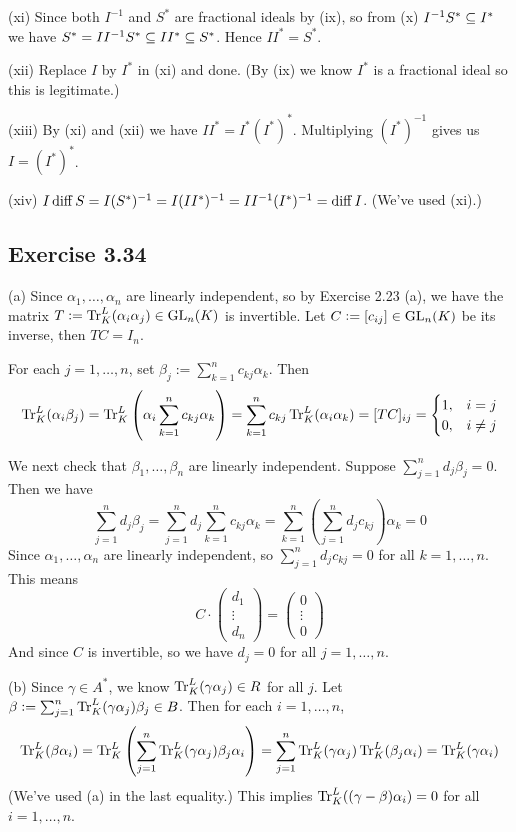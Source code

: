 \documentclass[../Marcus.tex]{subfiles}
\begin{document}
(xi) Since both $I^{-1}$ and $S^*$ are fractional ideals by (ix), so from (x) $I^{-1}S^* \subseteq I^*$ we have $S^* = II^{-1}S^* \subseteq II^* \subseteq S^*$. Hence $II^*=S^*$.

(xii) Replace $I$ by $I^*$ in (xi) and done. (By (ix) we know $I^*$ is a fractional ideal so this is legitimate.)

(xiii) By (xi) and (xii) we have $II^* = I^*(I^*)^*$. Multiplying $(I^*)^{-1}$ gives us $I=(I^*)^*$.

(xiv) $I \operatorname{diff} S = I(S^*)^{-1} = I(II^*)^{-1} = II^{-1}(I^*)^{-1} = \operatorname{diff} I$. (We've used (xi).)

\subsection*{Exercise 3.34}

(a) Since $\alpha_1,\ldots,\alpha_n$ are linearly independent, so by Exercise 2.23 (a), we have the matrix $T := \operatorname{Tr}^L_K(\alpha_i\alpha_j) \in \operatorname{GL}_n(K)$ is invertible. Let $C:=[c_{ij}] \in \operatorname{GL}_n(K)$ be its inverse, then $TC=I_n$.

For each $j=1,\ldots,n$, set $\beta_j:=\sum_{k=1}^n c_{kj}\alpha_k$. Then
$$
	\operatorname{Tr}^L_K(\alpha_i\beta_j)
	= \operatorname{Tr}^L_K \left(\alpha_i \sum_{k=1}^n c_{kj}\alpha_k \right)
	= \sum_{k=1}^n c_{kj} \operatorname{Tr}^L_K(\alpha_i\alpha_k) = [TC]_{ij}
	= \begin{cases}
		1, & i=j \\
		0, & i\neq j
	  \end{cases}
$$

We next check that $\beta_1,\ldots,\beta_n$ are linearly independent. Suppose $\sum_{j=1}^n d_j\beta_j = 0$. Then we have
$$
\sum_{j=1}^n d_j\beta_j
= \sum_{j=1}^n d_j \sum_{k=1}^n c_{kj}\alpha_k
=  \sum_{k=1}^n \left( \sum_{j=1}^n d_j c_{kj} \right) \alpha_k
= 0
$$
Since $\alpha_1,\ldots,\alpha_n$ are linearly independent, so $\sum_{j=1}^n d_j c_{kj} = 0$ for all $k=1,\ldots,n$. This means
$$
C \cdot
\begin{pmatrix}
    d_1 \\
    \vdots \\
    d_n
\end{pmatrix}
=
\begin{pmatrix}
    0 \\
    \vdots \\
    0
\end{pmatrix}
$$
And since $C$ is invertible, so we have $d_j=0$ for all $j=1,\ldots,n$.

(b) Since $\gamma \in A^*$, we know $\operatorname{Tr}^L_K(\gamma\alpha_j) \in R$ for all $j$. Let $\beta:=\sum_{j=1}^n \operatorname{Tr}^L_K(\gamma\alpha_j)\beta_j \in B$. Then for each $i=1,\ldots,n$,
$$
\operatorname{Tr}^L_K(\beta\alpha_i)
= \operatorname{Tr}^L_K \left( \sum_{j=1}^n \operatorname{Tr}^L_K(\gamma\alpha_j) \beta_j \alpha_i \right)
= \sum_{j=1}^n \operatorname{Tr}^L_K(\gamma\alpha_j) \operatorname{Tr}^L_K(\beta_j \alpha_i )
= \operatorname{Tr}^L_K(\gamma\alpha_i)
$$
(We've used (a) in the last equality.) This implies $\operatorname{Tr}^L_K((\gamma-\beta)\alpha_i) = 0$ for all $i=1,\ldots,n$.
\end{document}
